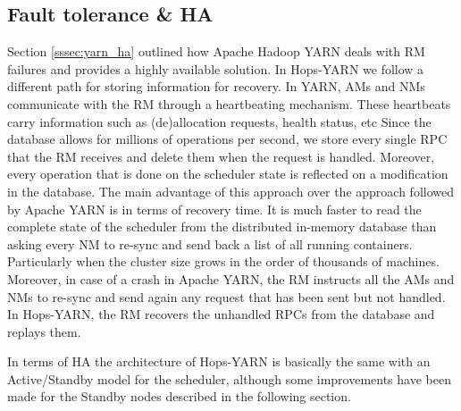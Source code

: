 \subsection{Fault tolerance \& HA}
\label{ssec:hopsyarn_fault_tol_ha}
Section \ref{sssec:yarn_ha} outlined how Apache Hadoop YARN
deals with RM failures and provides a highly available solution. In
Hops-YARN we follow a different path for storing information for
recovery. In YARN, AMs and NMs communicate with the RM through a
heartbeating mechanism. These heartbeats carry information such as
(de)allocation requests, health status, etc Since the database allows
for millions of operations per second, we store every single RPC that
the RM receives and delete them when the request is handled. Moreover,
every operation that is done on the scheduler state is reflected on a
modification in the database. The main advantage of this approach over
the approach followed by Apache YARN is in terms of recovery
time. It is much faster to read the complete state of the scheduler from the
distributed in-memory database than asking every NM to re-sync
and send back a list of all running containers. Particularly when
the cluster size grows in the order of thousands of
machines. Moreover, in case of a crash in Apache YARN, the RM
instructs all the AMs and NMs to re-sync and send again any request
that has been sent but not handled. In Hops-YARN, the RM recovers the
unhandled RPCs from the database and replays them.

In terms of HA the architecture of Hops-YARN is basically the same
with an Active/Standby model for the scheduler, although some
improvements have been made for the Standby nodes described in the
following section.

